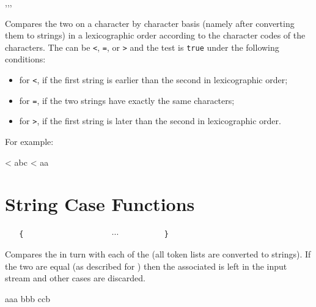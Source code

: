 \documentclass[oneside]{book}
\begin{document}
\begin{function}{\strCompare,\strCompareT,\strCompareF,\strCompareTF}
\begin{syntax}
   
    
    
     
\end{syntax}
Compares the two  on a character by character
basis (namely after converting them to strings) in a lexicographic
order according to the character codes of the characters.  The
 can be \verb|<|, \verb|=|, or \verb|>| and the test is
\texttt{true} under the following conditions:
\begin{itemize}[nosep]
\item for \verb|<|, if the first string is earlier than the second in lexicographic order;
\item for \verb|=|, if the two strings have exactly the same characters;
\item for \verb|>|, if the first string is later than the second in lexicographic order.
\end{itemize}
For example:
\begin{demohigh}
 < {abc} {} {}
 < {aa} {} {}
\end{demohigh}
\end{function}

\section{String Case Functions}

\begin{function}{\strCase}
\begin{syntax}
 
~ ~ \verb|{|
~ ~ ~ ~  
~ ~ ~ ~  
~ ~ ~ ~ $\cdots$
~ ~ ~ ~  
~ ~ \verb|}|
\end{syntax}
Compares the  in turn with each
of the  (all token lists are converted to strings).
If the two are equal (as described for
) then the associated  is left in the
input stream and other cases are discarded.
\begin{demohigh}
\IgnoreSpacesOn
{} {
  {aaa} {}
  {bbb} {}
  {ccb} {}
}
\IgnoreSpacesOff
\end{demohigh}
\end{function}
\end{document}
